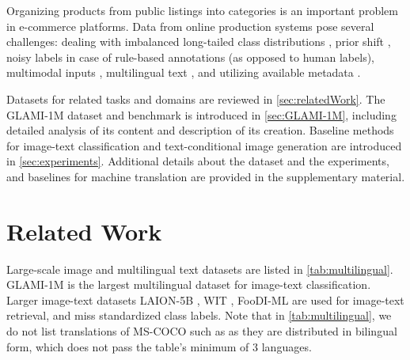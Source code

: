 \documentclass{bmvc2k}
\begin{document}
Organizing products from public listings into categories is an important problem in e-commerce platforms. 
Data from online production systems pose several challenges: dealing with imbalanced long-tailed class distributions \cite{shopify}, prior shift \cite{priorShift,vsipka2022hitchhiker}, noisy labels in case of rule-based annotations \cite{Sun2014ChimeraLC,distillingFromNoise} (as opposed to human labels), multimodal inputs \cite{shopify,foodi}, multilingual text \cite{shopify,foodi}, and utilizing available metadata \cite{df20}.





Datasets for related tasks and domains are reviewed in \autoref{sec:relatedWork}. The GLAMI-1M dataset and benchmark is introduced in \autoref{sec:GLAMI-1M}, including detailed analysis of its content and description of its creation. Baseline methods for image-text classification and text-conditional image generation are introduced in \autoref{sec:experiments}.  Additional details about the dataset and the experiments, and baselines for machine translation are provided in the supplementary material.

\section{Related Work}
\label{sec:relatedWork}

Large-scale image and multilingual text datasets are listed in \autoref{tab:multilingual}.
GLAMI-1M is the largest multilingual dataset for image-text classification.
Larger image-text datasets LAION-5B \cite{LAION5B}, WIT \cite{wit}, FooDI-ML \cite{foodi} are used for image-text retrieval, and miss standardized class labels.
Note that in \autoref{tab:multilingual}, we do not list translations of MS-COCO \cite{coco} such as  \cite{japaneseCoco,italianCoco,germanCoco,dutchCoco,chineseCoco,vietnameseCoco} as they are distributed in bilingual form, which does not pass the table's minimum of 3 languages. 
\end{document}
